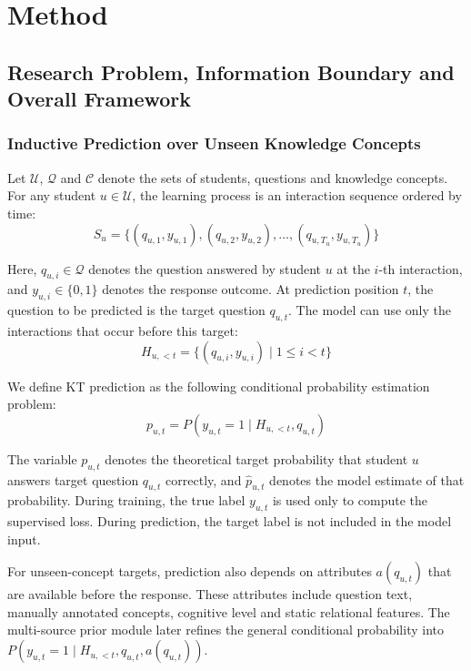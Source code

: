 \documentclass[a4paper,12pt]{article}
\numberwithin{table}{section}
\begin{document}
\section{Method}

\subsection{Research Problem, Information Boundary and Overall Framework}

\subsubsection{Inductive Prediction over Unseen Knowledge Concepts}

Let \(\mathcal{U}\), \(\mathcal{Q}\) and \(\mathcal{C}\) denote the sets of students, questions and knowledge concepts. For any student \(u\in\mathcal{U}\), the learning process is an interaction sequence ordered by time:
\[
S_u=\{(q_{u,1},y_{u,1}),(q_{u,2},y_{u,2}),\ldots,(q_{u,T_u},y_{u,T_u})\}
\]

Here, \(q_{u,i}\in\mathcal{Q}\) denotes the question answered by student \(u\) at the \(i\)-th interaction, and \(y_{u,i}\in\{0,1\}\) denotes the response outcome. At prediction position \(t\), the question to be predicted is the target question \(q_{u,t}\). The model can use only the interactions that occur before this target:
\[
H_{u,<t}=\{(q_{u,i},y_{u,i})\mid 1\leq i<t\}
\]

We define KT prediction as the following conditional probability estimation problem:
\[
p_{u,t}=P(y_{u,t}=1\mid H_{u,<t},q_{u,t})
\]

The variable \(p_{u,t}\) denotes the theoretical target probability that student \(u\) answers target question \(q_{u,t}\) correctly, and \(\hat{p}_{u,t}\) denotes the model estimate of that probability. During training, the true label \(y_{u,t}\) is used only to compute the supervised loss. During prediction, the target label is not included in the model input.

For unseen-concept targets, prediction also depends on attributes \(a(q_{u,t})\) that are available before the response. These attributes include question text, manually annotated concepts, cognitive level and static relational features. The multi-source prior module later refines the general conditional probability into \(P(y_{u,t}=1\mid H_{u,<t},q_{u,t},a(q_{u,t}))\).
\end{document}
